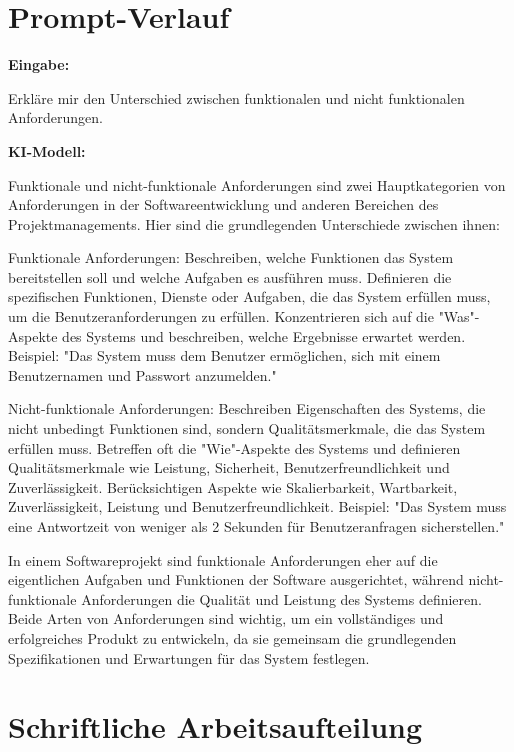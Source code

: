 \section{Prompt-Verlauf}

\textbf{Eingabe:} 

Erkläre mir den Unterschied zwischen funktionalen und nicht funktionalen Anforderungen.

\textbf{KI-Modell:} 

Funktionale und nicht-funktionale Anforderungen sind zwei Hauptkategorien von Anforderungen in der Softwareentwicklung und anderen Bereichen des Projektmanagements. Hier sind die grundlegenden Unterschiede zwischen ihnen:

Funktionale Anforderungen:
Beschreiben, welche Funktionen das System bereitstellen soll und welche Aufgaben es ausführen muss.
Definieren die spezifischen Funktionen, Dienste oder Aufgaben, die das System erfüllen muss, um die Benutzeranforderungen zu erfüllen.
Konzentrieren sich auf die "Was"-Aspekte des Systems und beschreiben, welche Ergebnisse erwartet werden.
Beispiel: "Das System muss dem Benutzer ermöglichen, sich mit einem Benutzernamen und Passwort anzumelden."

Nicht-funktionale Anforderungen:
Beschreiben Eigenschaften des Systems, die nicht unbedingt Funktionen sind, sondern Qualitätsmerkmale, die das System erfüllen muss.
Betreffen oft die "Wie"-Aspekte des Systems und definieren Qualitätsmerkmale wie Leistung, Sicherheit, Benutzerfreundlichkeit und Zuverlässigkeit.
Berücksichtigen Aspekte wie Skalierbarkeit, Wartbarkeit, Zuverlässigkeit, Leistung und Benutzerfreundlichkeit.
Beispiel: "Das System muss eine Antwortzeit von weniger als 2 Sekunden für Benutzeranfragen sicherstellen."

In einem Softwareprojekt sind funktionale Anforderungen eher auf die eigentlichen Aufgaben und Funktionen der Software ausgerichtet, während nicht-funktionale Anforderungen die Qualität und Leistung des Systems definieren. Beide Arten von Anforderungen sind wichtig, um ein vollständiges und erfolgreiches Produkt zu entwickeln, da sie gemeinsam die grundlegenden Spezifikationen und Erwartungen für das System festlegen.


\section{Schriftliche Arbeitsaufteilung}


